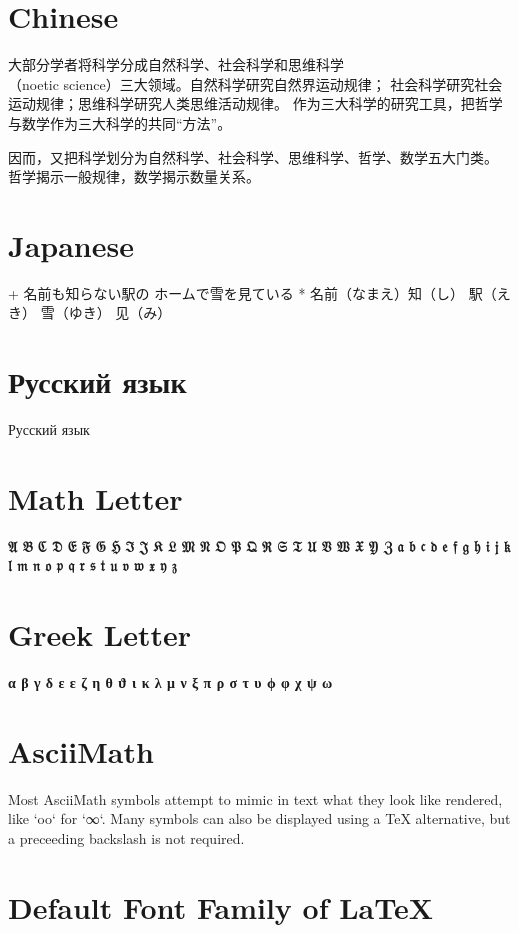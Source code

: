 \documentclass{article}
\begin{document}
\section{Chinese}
\begin{multicols}{2}
大部分学者将科学分成自然科学、社会科学和思维科学\\
（noetic science）三大领域。自然科学研究自然界运动规律；\newline
社会科学研究社会运动规律；思维科学研究人类思维活动规律。\break
作为三大科学的研究工具，把哲学与数学作为三大科学的共同“方法”。

因而，又把科学划分为自然科学、社会科学、思维科学、哲学、数学五大门类。
哲学揭示一般规律，数学揭示数量关系。
\end{multicols}

\section{Japanese}

+ 名前も知らない駅の ホームで雪を見ている
* 名前（なまえ）知（し） 駅（えき） 雪（ゆき） 见（み）

\section{Русский язык}
Русский язык

\section{Math Letter}
\bfseries
𝔄 𝔅 ℭ 𝔇 𝔈 𝔉 𝔊 ℌ ℑ 𝔍 𝔎 𝔏 𝔐 𝔑 𝔒 𝔓 𝔔 ℜ 𝔖 𝔗 𝔘 𝔙 𝔚 𝔛 𝔜 ℨ
𝔞 𝔟 𝔠 𝔡 𝔢 𝔣 𝔤 𝔥 𝔦 𝔧 𝔨 𝔩 𝔪 𝔫 𝔬 𝔭 𝔮 𝔯 𝔰 𝔱 𝔲 𝔳 𝔴 𝔵 𝔶 𝔷

\section{Greek Letter}
\bfseries
α β γ δ ε ɛ ζ η θ ϑ ι κ λ μ ν ξ π ρ σ τ υ ϕ φ χ ψ ω

\section{AsciiMath}
\sffamily
Most AsciiMath symbols attempt to mimic in text what they look like rendered, 
like `oo` for `∞`. Many symbols can also be displayed using a TeX alternative, 
but a preceeding backslash is not required.

\section{Default Font Family of LaTeX}
\bfseries
\end{document}
